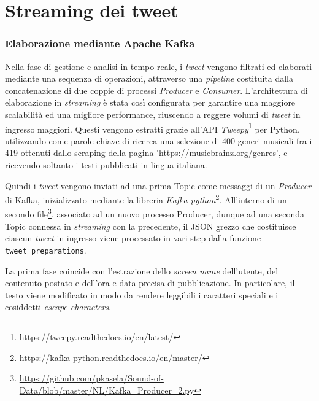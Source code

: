 \documentclass[12pt, a4paper, twocolumn]{article} %
\begin{document}
\hfill
\newpage
\part{Streaming dei tweet}
\section{Elaborazione mediante Apache Kafka}
%
Nella fase di gestione e analisi in tempo reale, i \textit{tweet} vengono filtrati ed elaborati mediante una sequenza di operazioni, attraverso una \textit{pipeline} costituita dalla concatenazione di due coppie di processi \textit{Producer} e \textit{Consumer}.
L'architettura di elaborazione in \textit{streaming} è stata così configurata per garantire una maggiore scalabilità ed una migliore performance, riuscendo a reggere volumi di \textit{tweet} in ingresso maggiori.
Questi vengono estratti grazie all'API \textit{Tweepy}\footnote{\url{https://tweepy.readthedocs.io/en/latest/}} per Python, utilizzando come parole chiave di ricerca una selezione di 400 generi musicali fra i 419 ottenuti dallo scraping della pagina \url{'https://musicbrainz.org/genres'}, e ricevendo soltanto i testi pubblicati in lingua italiana.

Quindi i \textit{tweet} vengono inviati ad una prima Topic come messaggi di un \textit{Producer} di Kafka, inizializzato mediante la libreria \textit{Kafka-python}\footnote{\url{https://kafka-python.readthedocs.io/en/master/}}. 
All'interno di un secondo file\footnote{\url{https://github.com/pkasela/Sound-of-Data/blob/master/NL/Kafka_Producer_2.py}}, associato ad un nuovo processo Producer, dunque ad una seconda Topic connessa in \textit{streaming} con la precedente, il JSON grezzo che costituisce ciascun \textit{tweet} in ingresso viene processato in vari step dalla funzione \verb|tweet_preparations|.

La prima fase coincide con l'estrazione dello \textit{screen name} dell'utente, del contenuto postato e dell'ora e data precisa di pubblicazione. 
In particolare, il testo viene modificato in modo da rendere leggibili i caratteri speciali e i cosiddetti \textit{escape characters}. 
\end{document}

